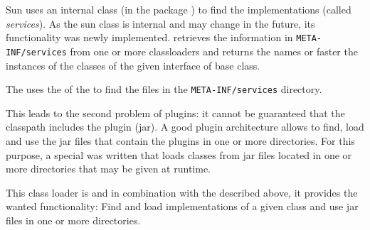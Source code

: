 \documentclass[a4paper]{article} %
\begin{document}
Sun uses an internal class (in the package ) to
find the implementations (called \textit{services}). As the sun class
is internal and may change in the future, its functionality was newly
implemented. 
retrieves the information in \texttt{META-INF/services} from one or
more classloaders and returns the names or faster the instances of the
classes of the given interface of base class.

The  uses the
 of the  to
find the files in the \texttt{META-INF/services} directory. 

This leads to the second problem of plugins: it cannot be guaranteed
that the classpath includes the plugin (jar). A good plugin
architecture allows to find, load and use the jar files that contain
the plugins in one or more directories. For this purpose, a special
 was written that loads classes from jar files
located in one or more directories that may be given at runtime.

This class loader is
and in combination with the  described
above, it provides the wanted functionality: Find and load
implementations of a given class and use jar files in one or more
directories.










%
% 



\documentend
\end{document}
